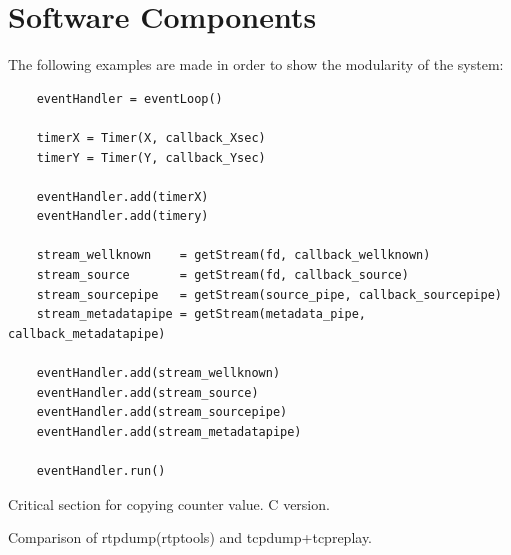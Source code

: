 \section{Software Components}
The following examples are made in order to show the modularity of the system:



\begin{listing}[h] 
\begin{verbatim}
	eventHandler = eventLoop()
	
	timerX = Timer(X, callback_Xsec)
	timerY = Timer(Y, callback_Ysec)
	
	eventHandler.add(timerX)
	eventHandler.add(timery)
	
	stream_wellknown    = getStream(fd, callback_wellknown)
	stream_source       = getStream(fd, callback_source)
	stream_sourcepipe   = getStream(source_pipe, callback_sourcepipe)
	stream_metadatapipe = getStream(metadata_pipe, callback_metadatapipe)	
	
	eventHandler.add(stream_wellknown)
	eventHandler.add(stream_source)
	eventHandler.add(stream_sourcepipe)
	eventHandler.add(stream_metadatapipe)
	
	eventHandler.run()
\end{verbatim}
\caption{Critical section for copying counter value. C version.}
\label{code:critical_section_c}
\end{listing}




Comparison of rtpdump(rtptools) and tcpdump+tcpreplay.

\begin{table}[H]
\centering
{}
\caption{My caption}
\label{my-label}
\end{table}



